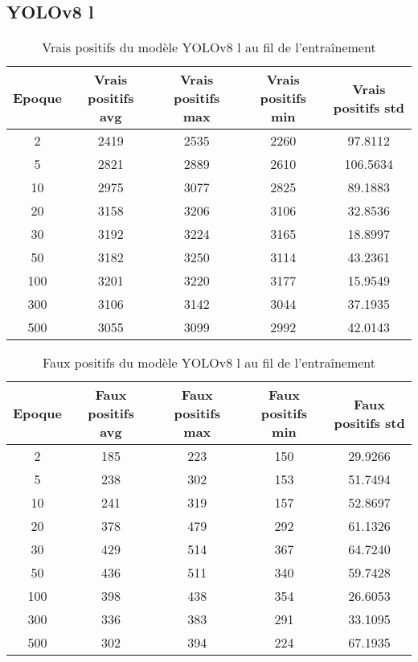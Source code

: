 
\clearpage
\subsection{YOLOv8 l}

\begin{table}[!ht]
    \caption{Vrais positifs du modèle YOLOv8 l au fil de l'entraînement}
    \label{tab:yolov8l_true_positive}
    \centering
    \begin{tabular}{ |c||c|c|c|c|  }
        \hline
        \rowcolor{gray!50}
        Epoque & Vrais positifs avg & Vrais positifs max & Vrais positifs min & Vrais positifs std\\
        \hline
        2 & 2419 & 2535 & 2260 & 97.8112\\
        5 & 2821 & 2889 & 2610 & 106.5634\\
        10 & 2975 & 3077 & 2825 & 89.1883\\
        20 & 3158 & 3206 & 3106 & 32.8536\\
        30 & 3192 & 3224 & 3165 & 18.8997\\
        50 & 3182 & 3250 & 3114 & 43.2361\\
        100 & 3201 & 3220 & 3177 & 15.9549\\
        300 & 3106 & 3142 & 3044 & 37.1935\\
        500 & 3055 & 3099 & 2992 & 42.0143\\
        \hline
    \end{tabular}
\end{table}

\begin{table}[!ht]
    \caption{Faux positifs du modèle YOLOv8 l au fil de l'entraînement}
    \label{tab:yolov8l_false_positive}
    \centering
    \begin{tabular}{ |c||c|c|c|c|  }
        \hline
        \rowcolor{gray!50}
        Epoque & Faux positifs avg & Faux positifs max & Faux positifs min & Faux positifs std\\
        \hline
        2 & 185 & 223 & 150 & 29.9266\\
        5 & 238 & 302 & 153 & 51.7494\\
        10 & 241 & 319 & 157 & 52.8697\\
        20 & 378 & 479 & 292 & 61.1326\\
        30 & 429 & 514 & 367 & 64.7240\\
        50 & 436 & 511 & 340 & 59.7428\\
        100 & 398 & 438 & 354 & 26.6053\\
        300 & 336 & 383 & 291 & 33.1095\\
        500 & 302 & 394 & 224 & 67.1935\\
        \hline
    \end{tabular}
\end{table}

